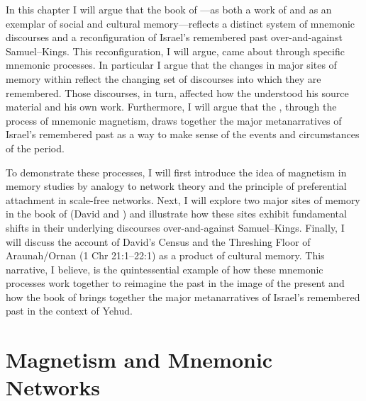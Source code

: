 In this chapter I will argue that the book of \chronicles---as both a work of \rwb and as an exemplar of social and cultural memory---reflects a distinct system of mnemonic discourses and a reconfiguration of Israel's remembered past over-and-against Samuel--Kings. This reconfiguration, I will argue, came about through specific mnemonic processes. In particular I argue that the changes in major sites of memory within \chronicles reflect the changing set of discourses into which they are remembered. Those discourses, in turn, affected how the \chronicler understood his source material and his own work. Furthermore, I will argue that the \chronicler, through the process of mnemonic magnetism, draws together the major metanarratives of Israel's remembered past as a way to make sense of the events and circumstances of the \secondtemple period.

To demonstrate these processes, I will first introduce the idea of magnetism in memory studies by analogy to network theory and the principle of preferential attachment in scale-free networks. Next, I will explore two major sites of memory in the book of \chronicles (David and \thetemple) and illustrate how these sites exhibit fundamental shifts in their underlying discourses over-and-against Samuel--Kings. Finally, I will discuss the account of David's Census and the Threshing Floor of Araunah/Ornan (1 Chr 21:1--22:1) as a product of cultural memory. This narrative, I believe, is the quintessential example of how these mnemonic processes work together to reimagine the past in the image of the present and how the book of \chronicles brings together the major metanarratives of Israel's remembered past in the context of \secondtemple Yehud.

\section{Magnetism and Mnemonic Networks}

